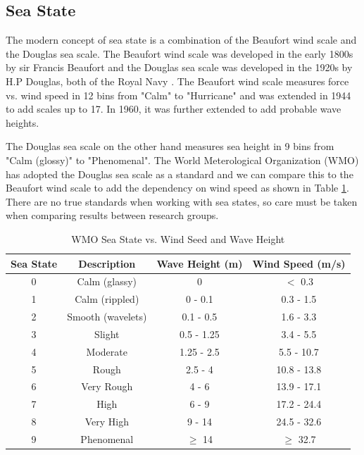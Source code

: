 \subsection {Sea State}
The modern concept of sea state is a combination of the Beaufort wind scale and the Douglas sea scale. The Beaufort wind scale was developed in the early 1800s by sir Francis Beaufort and the Douglas sea scale was developed in the 1920s by H.P Douglas, both of the Royal Navy \cite{uk_met_fact_sheet6}. The Beaufort wind scale measures force vs. wind speed in 12 bins from "Calm" to "Hurricane" and was extended in 1944 to add scales up to 17. In 1960, it was further extended to add probable wave heights. 

The Douglas sea scale on the other hand measures sea height in 9 bins from "Calm (glossy)" to "Phenomenal". The World Meterological Organization (WMO) has adopted the Douglas sea scale as a standard \cite{wmo_code} and we can compare this to the Beaufort wind scale to add the dependency on wind speed as shown in Table \ref{os_tab:0}. There are no true standards when working with sea states, so care must be taken when comparing results between research groups.

\begin{table}[H]
  \begin{center}
      \renewcommand{\baselinestretch}{1} \small\normalsize
  \begin{quote}
    \caption[WMO Sea State vs. Wind Speed and Wave Height]{WMO Sea State vs. Wind Seed and Wave Height\label{os_tab:0}}
  \end{quote}
  \begin{tabular} {|c | c | c| c|}
    \hline
  \bf{Sea State} & \bf{Descriptio}n & \bf{Wave Height (m)} & \bf{Wind Speed (m/s)}\\ \hline
  0 & Calm (glassy) & 0 & $<$ 0.3 \\ \hline
  1 & Calm (rippled) & 0 - 0.1 & 0.3 - 1.5 \\ \hline
  2 & Smooth (wavelets) & 0.1 - 0.5 & 1.6 - 3.3 \\ \hline
  3 & Slight & 0.5 - 1.25 & 3.4 - 5.5 \\ \hline
  4 & Moderate & 1.25 - 2.5 & 5.5 - 10.7 \\ \hline
  5 & Rough & 2.5 - 4 & 10.8 - 13.8 \\ \hline
  6 & Very Rough & 4 - 6 & 13.9 - 17.1\\ \hline
  7 & High & 6 - 9 & 17.2 - 24.4\\ \hline
  8 & Very High & 9 - 14 & 24.5 - 32.6\\ \hline
  9 & Phenomenal & $\geq$ 14 & $\geq$ 32.7\\ \hline
\end{tabular}
\end{center}
\end{table}
\renewcommand{\baselinestretch}{2} \small\normalsize

